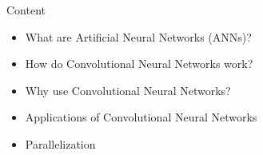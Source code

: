 \begin{frame}{Content}
    \begin{itemize}
        \item What are Artificial Neural Networks (ANNs)?
        \item How do Convolutional Neural Networks work?
        \item Why use Convolutional Neural Networks?
        \item Applications of Convolutional Neural Networks
        \item Parallelization
    \end{itemize}
\end{frame}